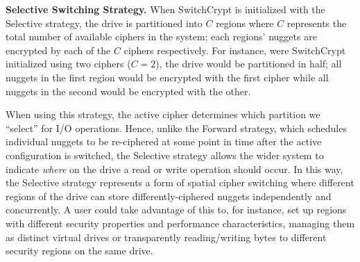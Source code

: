 
\textbf{Selective Switching Strategy.} When SwitchCrypt is initialized with the
Selective strategy, the drive is partitioned into $C$ regions where $C$
represents the total number of available ciphers in the system; each regions'
nuggets are encrypted by each of the $C$ ciphers respectively. For instance,
were SwitchCrypt initialized using two ciphers ($C = 2$), the drive would be
partitioned in half; all nuggets in the first region would be encrypted with the
first cipher while all nuggets in the second would be encrypted with the other.


When using this strategy, the active cipher determines which partition we
``select'' for I/O operations. Hence, unlike the Forward strategy, which
schedules individual nuggets to be re-ciphered at some point in time after the
active configuration is switched, the Selective strategy allows the wider system
to indicate \emph{where} on the drive a read or write operation should occur. In
this way, the Selective strategy represents a form of spatial cipher switching
where different regions of the drive can store differently-ciphered nuggets
independently and concurrently. A user could take advantage of this to, for
instance, set up regions with different security properties and performance
characteristics, managing them as distinct virtual drives or transparently
reading/writing bytes to different security regions on the same drive.

